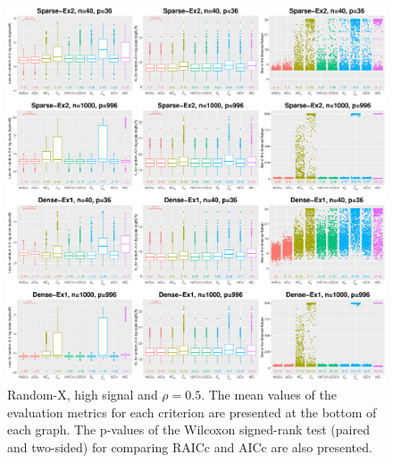 \begin{figure}[!ht]
  \centering
  \includegraphics[width=\textwidth]{figures/main/randomx/subset_selection/largep_hsnr.eps}
  \caption{Random-X, high signal and $\rho=0.5$. The mean values of the evaluation metrics for each criterion are presented at the bottom of each graph. The p-values of the Wilcoxon signed-rank test (paired and two-sided) for comparing RAICc and AICc are also presented.}
  \label{fig:subsetselection_randomx_hsnr_largep}
\end{figure}


